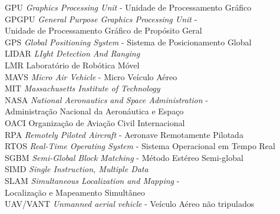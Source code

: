 \begin{tabbing}
\> GPU 	 	\> \textit{Graphics Processing Unit} - Unidade de Processamento Gráfico							\\
\> GPGPU 	\> \textit{General Purpose Graphics Processing Unit} -  								\\
\>		\> Unidade de Processamento Gráfico de Propósito Geral									\\
\> GPS 	 	\> \textit{Global Positioning System} - Sistema de Posicionamento Global						\\
\> LIDAR 	\> \textit{LIght Detection And Ranging}											\\
\> LMR 	 	\> Laboratório de Robótica Móvel											\\
\> MAVS  	\> \textit{Micro Air Vehicle} - Micro Veículo Aéreo									\\
\> MIT 	 	\> \textit{Massachusetts Institute of Technology}									\\
\> NASA	 	\> \textit{National Aeronautics and Space Administration} - 								\\
\>		\> Administração Nacional da Aeronáutica e Espaço									\\
\> OACI  	\> Organização de Aviação Civil Internacional 										\\
\> RPA 	 	\> \textit{Remotely Piloted Aircraft} - Aeronave Remotamente Pilotada							\\
\> RTOS	 	\> \textit{Real-Time Operating System} - Sistema Operacional em Tempo Real						\\
\> SGBM  	\> \textit{Semi-Global Block Matching} - Método Estéreo Semi-global							\\
\> SIMD  	\> \textit{Single Instruction, Multiple Data}										\\
\> SLAM  	\> \textit{Simultaneous Localization and Mapping} - 									\\
\>		\> Localização e Mapeamento Simultâneo											\\
\> UAV/VANT 	\> \textit{Unmanned aerial vehicle} - Veículo Aéreo não tripulados 							\\

\end{tabbing}
\cleardoublepage
\pagestyle{fancy}
\fancyhf{} %
\fancyhead[RO, LE] {\thepage}


\tableofcontents %
